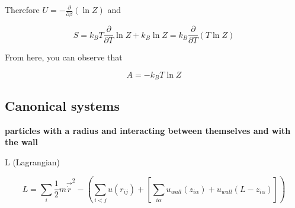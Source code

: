	Therefore $U = - \frac{\partial}{\partial \beta}(\ln{Z})$ and 

	$$
	S = k_B T \frac{\partial}{\partial T}\ln{Z} + k_B \ln{Z} = k_B \frac{\partial}{\partial T}(T \ln{Z})
	$$

	From here, you can observe that

	$$
	A =  - k_B T \ln{Z}
	$$


\subsection{Canonical systems}

\textbf{particles with a radius and interacting between themselves and with the wall}

L (Lagrangian)

$$
L = \sum_i{\frac{1}{2} m \vec{\dot{r}}}^2 - \left(\sum_{i<j}{u(r_{ij})} + \left[\sum_{i\alpha}{u_{wall}(z_{i\alpha}) + u_{wall}(L - z_{i\alpha})}\right]\right)
$$